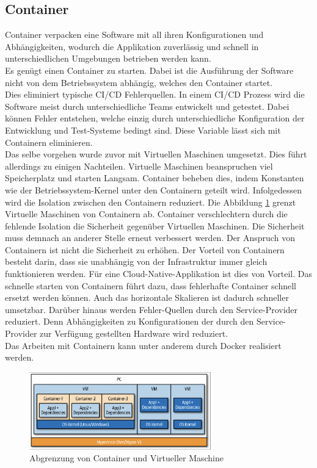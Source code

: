 \subsection{Container}
Container verpacken eine Software mit all ihren Konfigurationen und Abhängigkeiten, wodurch die Applikation zuverlässig und schnell in unterschiedlichen Umgebungen betrieben werden kann.\\
Es genügt einen Container zu starten. Dabei ist die Ausführung der Software nicht von dem Betriebssystem abhängig, welches den Container startet.\\
Dies eliminiert typische CI/CD Fehlerquellen. In einem CI/CD Prozess wird die Software meist durch unterschiedliche Teams entwickelt und getestet. Dabei können Fehler entstehen, welche einzig durch unterschiedliche Konfiguration der Entwicklung und Test-Systeme bedingt sind. Diese Variable lässt sich mit Containern eliminieren.\\
Das selbe vorgehen wurde zuvor mit Virtuellen Maschinen umgesetzt. Dies führt allerdings zu einigen Nachteilen. Virtuelle Maschinen beanspruchen viel Speicherplatz und starten Langsam. Container beheben dies, indem Konstanten wie der Betriebssystem-Kernel unter den Containern geteilt wird. Infolgedessen wird die Isolation zwischen den Containern reduziert. Die Abbildung \ref{fig:vm-vs-container} grenzt Virtuelle Maschinen von Containern ab. Container verschlechtern durch die fehlende Isolation die Sicherheit gegenüber Virtuellen Maschinen. Die Sicherheit muss demnach an anderer Stelle erneut verbessert werden. Der Anspruch von Containern ist nicht die Sicherheit zu erhöhen. Der Vorteil von Containern besteht darin, dass sie unabhängig von der Infrastruktur immer gleich funktionieren werden. Für eine Cloud-Native-Applikation ist dies von Vorteil. Das schnelle starten von Containern führt dazu, dass fehlerhafte Container schnell ersetzt werden können. Auch das horizontale Skalieren ist dadurch schneller umsetzbar. Darüber hinaus werden Fehler-Quellen durch den Service-Provider reduziert. Denn Abhängigkeiten zu Konfigurationen der durch den Service-Provider zur Verfügung gestellten Hardware wird reduziert.\\
Das Arbeiten mit Containern kann unter anderem durch Docker realisiert werden. 

\begin{figure}[bth] 
  \centering
  \includegraphics[width=0.7\textwidth]{Chapters/2-Grundlagen/Graphics/container-vs-vm.png}
  \caption{Abgrenzung von Container und Virtueller Maschine \cite{scholl_cloud_2019}}
  \label{fig:vm-vs-container}
\end{figure}

